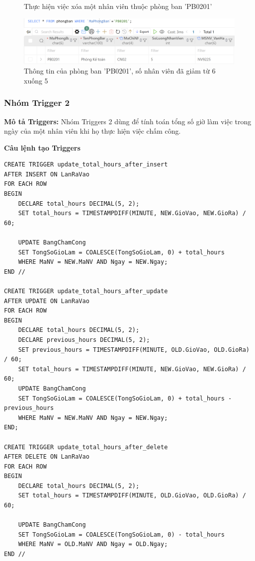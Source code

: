 \begin{itemize}
\begin{figure}[H]
        \caption{Thực hiện việc xóa một nhân viên thuộc phòng ban 'PB0201'}
        \label{fig:trigger_1_8}
    \end{figure}
    \begin{figure}[H]
        \centering
        \includegraphics[width=\linewidth]{content/images/trigger_1_9.png}
        \caption{Thông tin của phòng ban 'PB0201', số nhân viên đã giảm từ 6 xuống 5}
        \label{fig:trigger_1_9}
    \end{figure}
\end{itemize}

\newpage
\subsubsection{Nhóm Trigger 2}
\textbf{Mô tả Triggers:} Nhóm Triggers 2 dùng để tính toán tổng số giờ làm việc trong ngày của một nhân viên khi họ thực hiện việc chấm công.

\textbf{Câu lệnh tạo Triggers}
\begin{verbatim}
CREATE TRIGGER update_total_hours_after_insert
AFTER INSERT ON LanRaVao
FOR EACH ROW
BEGIN
    DECLARE total_hours DECIMAL(5, 2);
    SET total_hours = TIMESTAMPDIFF(MINUTE, NEW.GioVao, NEW.GioRa) / 60;
    
    UPDATE BangChamCong
    SET TongSoGioLam = COALESCE(TongSoGioLam, 0) + total_hours
    WHERE MaNV = NEW.MaNV AND Ngay = NEW.Ngay;
END //

CREATE TRIGGER update_total_hours_after_update
AFTER UPDATE ON LanRaVao
FOR EACH ROW
BEGIN
    DECLARE total_hours DECIMAL(5, 2);
    DECLARE previous_hours DECIMAL(5, 2);
    SET previous_hours = TIMESTAMPDIFF(MINUTE, OLD.GioVao, OLD.GioRa) / 60;
    SET total_hours = TIMESTAMPDIFF(MINUTE, NEW.GioVao, NEW.GioRa) / 60;
    UPDATE BangChamCong
    SET TongSoGioLam = COALESCE(TongSoGioLam, 0) + total_hours - previous_hours
    WHERE MaNV = NEW.MaNV AND Ngay = NEW.Ngay;
END;

CREATE TRIGGER update_total_hours_after_delete
AFTER DELETE ON LanRaVao
FOR EACH ROW
BEGIN
    DECLARE total_hours DECIMAL(5, 2);
    SET total_hours = TIMESTAMPDIFF(MINUTE, OLD.GioVao, OLD.GioRa) / 60;
    
    UPDATE BangChamCong
    SET TongSoGioLam = COALESCE(TongSoGioLam, 0) - total_hours
    WHERE MaNV = OLD.MaNV AND Ngay = OLD.Ngay;
END //    
\end{verbatim}

